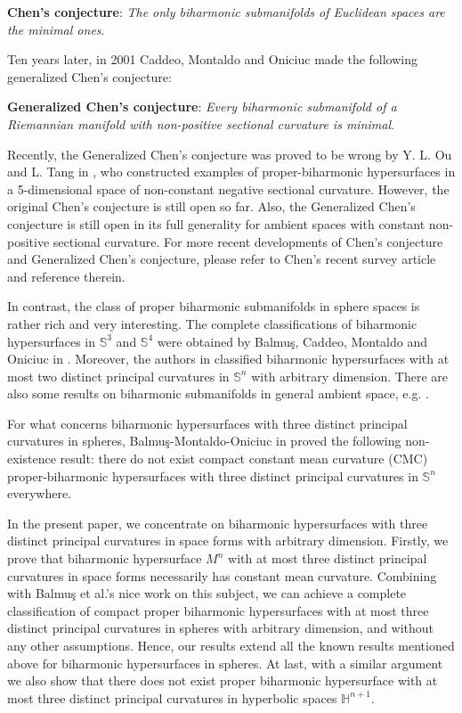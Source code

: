 \documentclass[twoside,reqno,A4]{amsart}
\theoremstyle{definition}
\theoremstyle{remark}
\numberwithin{equation}{section}
\begin{document}
{\bf Chen's conjecture}: {\em The only biharmonic submanifolds of
Euclidean spaces are the minimal ones}.

Ten years later, in 2001 Caddeo, Montaldo and Oniciuc \cite{CMO2001}
made the following generalized Chen's conjecture:

{\bf Generalized Chen's conjecture}: {\em Every biharmonic
submanifold of a Riemannian manifold with non-positive sectional
curvature is minimal}.

Recently, the Generalized Chen's conjecture was proved to be wrong
by Y. L. Ou and L. Tang in \cite{Ou2012}, who constructed examples
of proper-biharmonic hypersurfaces in a 5-dimensional space of
non-constant negative sectional curvature. However, the original
Chen's conjecture is still open so far. Also, the Generalized Chen's
conjecture is still open in its full generality for ambient spaces
with constant non-positive sectional curvature. For more recent
developments of Chen's conjecture and Generalized Chen's conjecture,
please refer to Chen's recent survey article \cite{chen2013} and
reference therein.

In contrast, the class of proper biharmonic submanifolds in sphere
spaces is rather rich and very interesting. The complete
classifications of biharmonic hypersurfaces in $\mathbb S^3$ and
$\mathbb S^4$ were obtained by Balmu\c{s}, Caddeo, Montaldo and
Oniciuc in \cite{CMO2001, BMO20102}. Moreover, the authors in
\cite{BMO2008} classified biharmonic hypersurfaces with at most two
distinct principal curvatures in $\mathbb S^n$ with arbitrary
dimension. There are also some results on biharmonic submanifolds in
general ambient space, e.g. \cite{Ou2010}.

For what concerns biharmonic hypersurfaces with three distinct
principal curvatures in spheres, Balmu\c{s}-Montaldo-Oniciuc in
\cite{BMO20102} proved the following non-existence result: there do
not exist compact constant mean curvature (CMC) proper-biharmonic
hypersurfaces with three distinct principal curvatures in $\mathbb
S^n$ everywhere.

In the present paper, we concentrate on biharmonic hypersurfaces
with three distinct principal curvatures in space forms with
arbitrary dimension. Firstly, we prove that biharmonic hypersurface
$M^n$ with at most three distinct principal curvatures in space
forms necessarily has constant mean curvature. Combining with
Balmu\c{s} et al.'s nice work on this subject, we can achieve a
complete classification of compact proper biharmonic hypersurfaces
with at most three distinct principal curvatures in spheres with
arbitrary dimension, and without any other assumptions. Hence, our
results extend all the known results mentioned above for biharmonic
hypersurfaces in spheres. At last, with a similar argument we also
show that there does not exist proper biharmonic hypersurface with
at most three distinct principal curvatures in hyperbolic spaces
$\mathbb H^{n+1}$.
\end{document}
